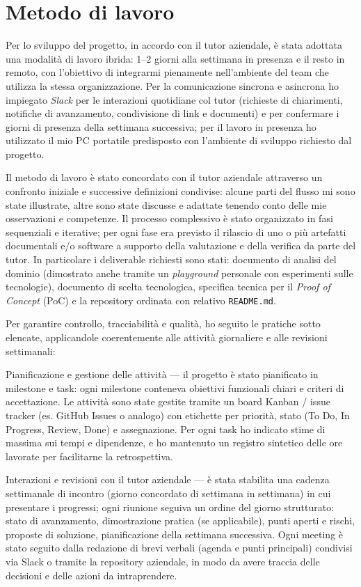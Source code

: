 \section{Metodo di lavoro}

Per lo sviluppo del progetto, in accordo con il tutor aziendale, è stata adottata una modalità di lavoro ibrida: 1–2 giorni alla settimana in presenza e il resto in remoto, 
con l'obiettivo di integrarmi pienamente nell'ambiente del team che utilizza la stessa organizzazione. Per la comunicazione sincrona e asincrona ho impiegato 
\emph{Slack} per le interazioni quotidiane col tutor (richieste di chiarimenti, notifiche di avanzamento, condivisione di link e documenti) e per confermare i giorni di presenza 
della settimana successiva; per il lavoro in presenza ho utilizzato il mio PC portatile predisposto con l'ambiente di sviluppo richiesto dal progetto.

Il metodo di lavoro è stato concordato con il tutor aziendale attraverso un confronto iniziale e successive definizioni condivise: alcune parti del 
flusso mi sono state illustrate, altre sono state discusse e adattate tenendo conto delle mie osservazioni e competenze. Il processo complessivo è stato organizzato 
in fasi sequenziali e iterative; per ogni fase era previsto il rilascio di uno o più artefatti documentali e/o software a supporto della valutazione e della 
verifica da parte del tutor. In particolare i deliverable richiesti sono stati: documento di analisi del dominio (dimostrato anche tramite un \emph{playground} 
personale con esperimenti sulle tecnologie), documento di scelta tecnologica, specifica tecnica per il \emph{Proof of Concept} (PoC) e la repository ordinata con relativo \texttt{README.md}.

Per garantire controllo, tracciabilità e qualità, ho seguito le pratiche sotto elencate, applicandole coerentemente alle attività giornaliere e alle revisioni settimanali:

Pianificazione e gestione delle attività — il progetto è stato pianificato in milestone e task: ogni milestone conteneva obiettivi funzionali chiari e criteri di accettazione. 
Le attività sono state gestite tramite un board Kanban / issue tracker (es. GitHub Issues o analogo) con etichette per priorità, stato (To Do, In Progress, Review, Done) e assegnazione. 
Per ogni task ho indicato stime di massima sui tempi e dipendenze, e ho mantenuto un registro sintetico delle ore lavorate per facilitarne la retrospettiva.

Interazioni e revisioni con il tutor aziendale — è stata stabilita una cadenza settimanale di incontro (giorno concordato di settimana in settimana) in cui presentare i progressi; 
ogni riunione seguiva un ordine del giorno strutturato: stato di avanzamento, dimostrazione pratica (se applicabile), punti aperti e rischi, proposte di soluzione, 
pianificazione della settimana successiva. Ogni meeting è stato seguito dalla redazione di brevi verbali (agenda e punti principali) condivisi via Slack o tramite la repository aziendale,
in modo da avere traccia delle decisioni e delle azioni da intraprendere.

